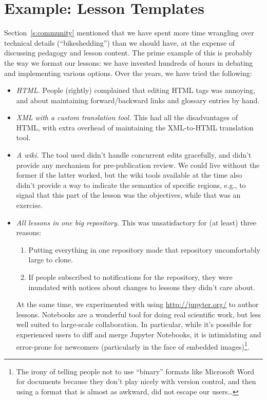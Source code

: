\documentclass[10pt,a4paper,twocolumn]{article}
\begin{document}
\section{Example: Lesson Templates}\label{s:lesson-templates}

Section~\ref{s:community} mentioned that we have spent more time
wrangling over technical details (``bikeshedding'') than we should
have, at the expense of discussing pedagogy and lesson content.  The
prime example of this is probably the way we format our lessons: we
have invested hundreds of hours in debating and implementing various
options.  Over the years, we have tried the following:

\begin{itemize}

\item \emph{HTML.}  People (rightly) complained that editing HTML tags
  was annoying, and about maintaining forward/backward links and
  glossary entries by hand.

\item \emph{XML with a custom translation tool.}  This had all the
  disadvantages of HTML, with extra overhead of maintaining the
  XML-to-HTML translation tool.

\item \emph{A wiki.} The tool used didn't handle concurrent edits
  gracefully, and didn't provide any mechanism for pre-publication
  review.  We could live without the former if the latter worked, but
  the wiki tools available at the time also didn't provide a way to
  indicate the semantics of specific regions, e.g., to signal that
  this part of the lesson was the objectives, while that was an
  exercise.

\item \emph{All lessons in one big repository.}  This was
  unsatisfactory for (at least) three reasons:

  \begin{enumerate}

  \item Putting everything in one repository made that repository
    uncomfortably large to clone.

  \item If people subscribed to notifications for the repository, they
    were inundated with notices about changes to lessons they didn't
    care about.

  \end{enumerate}

  At the same time, we experimented with using \href{Jupyter
  Notebooks}{http://jupyter.org/} to author lessons.  Notebooks are
  a wonderful tool for doing real scientific work, but less well
  suited to large-scale collaboration.  In particular, while it's
  possible for experienced users to diff and merge Jupyter Notebooks,
  it is intimidating and error-prone for newcomers (particularly in
  the face of embedded images)\footnote{The irony of telling people
    not to use ``binary'' formats like Microsoft Word for documents
    because they don't play nicely with version control, and then
    using a format that is almost as awkward, did not escape our
    users{\ldots}}.



\end{itemize}
\end{document}
